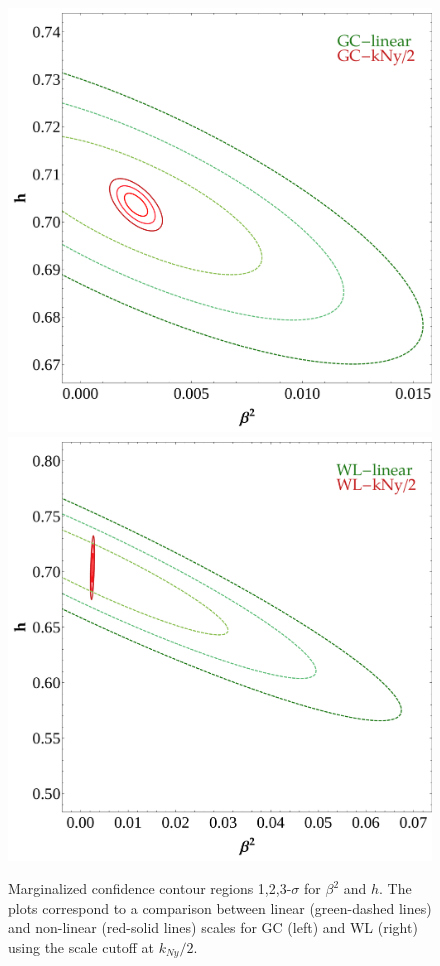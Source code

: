 \begin{figure}
\centering{}\includegraphics[height=0.35\textheight]{Chapters/fitting-funcs/figures/GC-linear-vs-PkCut-1p1-kNy-margedContours-h-beta}\includegraphics[height=0.35\textheight]{Chapters/fitting-funcs/figures/WL-linear-vs-PkCut-1p1-kNy-margedContours-h-beta}
\caption[Fisher confidence contour regions
for $\beta^{2}$ and $h$ in CDE using GC and WL surveys.]{\label{fig:Contour-scale} Marginalized confidence contour regions
1,2,3-$\sigma$ for $\beta^{2}$ and $h$. The plots correspond to
a comparison between linear (green-dashed lines) and non-linear (red-solid
lines) scales for GC (left) and WL (right) using the scale cutoff
at $k_{Ny}/2$. }
\end{figure}



